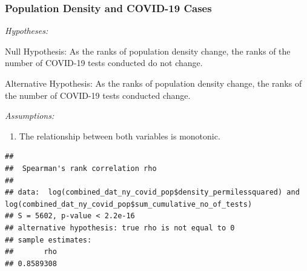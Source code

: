 \documentclass[
  12pt,
]{article}
\newenvironment{Shaded}{\begin{snugshade}}{\end{snugshade}}
\newcommand{\AttributeTok}[1]{\textcolor[rgb]{0.77,0.63,0.00}{#1}}
\newcommand{\CommentTok}[1]{\textcolor[rgb]{0.56,0.35,0.01}{\textit{#1}}}
\newcommand{\FunctionTok}[1]{\textcolor[rgb]{0.00,0.00,0.00}{#1}}
\newcommand{\NormalTok}[1]{#1}
\newcommand{\OtherTok}[1]{\textcolor[rgb]{0.56,0.35,0.01}{#1}}
\newcommand{\SpecialCharTok}[1]{\textcolor[rgb]{0.00,0.00,0.00}{#1}}
\newcommand{\StringTok}[1]{\textcolor[rgb]{0.31,0.60,0.02}{#1}}
\providecommand{\tightlist}{%
  \setlength{\itemsep}{0pt}\setlength{\parskip}{0pt}}
\begin{document}
\hypertarget{population-density-and-covid-19-cases-1}{%
\subsubsection{Population Density and COVID-19
Cases}\label{population-density-and-covid-19-cases-1}}

\emph{Hypotheses:}

Null Hypothesis: As the ranks of population density change, the ranks of
the number of COVID-19 tests conducted do not change.

Alternative Hypothesis: As the ranks of population density change, the
ranks of the number of COVID-19 tests conducted change.

\emph{Assumptions:}

\begin{enumerate}
\def\labelenumi{\arabic{enumi}.}
\tightlist
\item
  The relationship between both variables is monotonic.
\end{enumerate}

\begin{Shaded}
\end{Shaded}

\begin{verbatim}
## 
##  Spearman's rank correlation rho
## 
## data:  log(combined_dat_ny_covid_pop$density_permilessquared) and log(combined_dat_ny_covid_pop$sum_cumulative_no_of_tests)
## S = 5602, p-value < 2.2e-16
## alternative hypothesis: true rho is not equal to 0
## sample estimates:
##       rho 
## 0.8589308
\end{verbatim}
\end{document}
